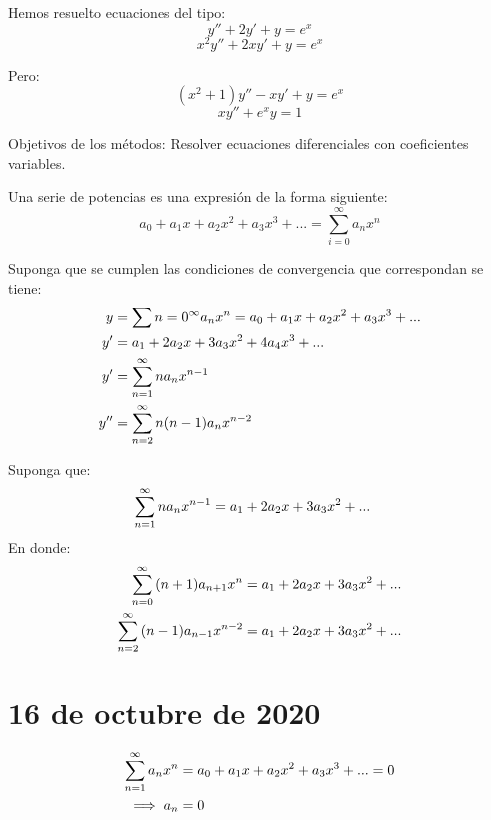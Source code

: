 \documentclass[11pt,fleqn]{book} %
\begin{document}
Hemos resuelto ecuaciones del tipo: 
$$y''+2y'+y=e^x$$ 
$$x^2 y''+2xy'+y=e^x$$

Pero: 
$$(x^2+1)y''-xy'+y=e^x$$
$$xy''+e^x y=1$$

Objetivos de los métodos: Resolver ecuaciones diferenciales con coeficientes variables. 

\begin{definition}
Una serie de potencias es una expresión de la forma siguiente:
\begin{equation}
    a_0 +a_1 x + a_2 x^2 + a_3 x^3 +... = \sum_{i=0}^\infty a_n x^n
\end{equation}
\end{definition}

\begin{notation}
Suponga que se cumplen las condiciones de convergencia que correspondan se tiene: 
\begin{align}
y&= \sum{n=0}^\infty a_n x^n = a_0 +a_1 x+a_2 x^2 +a_3 x^3 +...\\
y'&=a_1+2a_2 x +3a_3 x^2 + 4a_4 x^3 +...\\
y' &= \sum_{n=1}^\infty na_n x^{n-1}\\
y''&=\sum_{n=2}^{\infty}{n(n-1)a_n x^{n-2}}
\end{align}
\end{notation}

\begin{notation}
Suponga que:
\begin{align}
    \sum_{n=1}^{\infty}{na_n x^{n-1}} &= a_1 +2a_2x +3a_3 x^2 +... 
\end{align}
En donde:
\begin{align}
    \sum_{n=0}^{\infty}{(n+1)a_{n+1}x^n}&= a_1 +2a_2x +3a_3 x^2 +... \\
    \sum_{n=2}^{\infty}{(n-1)a_{n-1}x^{n-2}}&=a_1 +2a_2x +3a_3 x^2 +...
\end{align}
\end{notation}

\section{16 de octubre de 2020}
\begin{notation}
\begin{align}
    \sum_{n=1}^{\infty}{a_n x^n}&= a_0+a_1 x+a_2 x^2 +a_3 x^3 +... = 0\\
    \implies a_n&=0
\end{align}
\end{notation}
\end{document}
